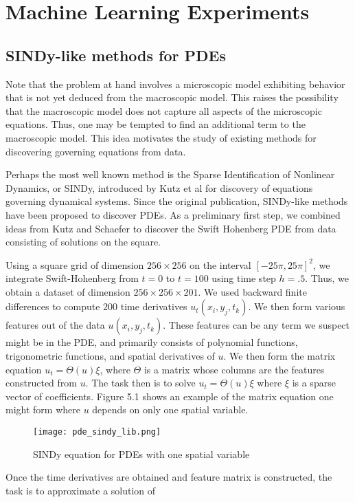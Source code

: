 \documentclass[12pt]{article}
\numberwithin{equation}{section}
\begin{document}
\section{Machine Learning Experiments}
\subsection{SINDy-like methods for PDEs}
\par Note that the problem at hand involves a microscopic model exhibiting behavior that is not yet deduced from the macroscopic model. This raises the possibility that the macroscopic model does not capture all aspects of the microscopic equations. Thus, one may be tempted to find an additional term to the macroscopic model. This idea motivates the study of existing methods for discovering governing equations from data.
\par Perhaps the most well known method is the Sparse Identification of Nonlinear Dynamics, or SINDy, introduced by Kutz et al for discovery of equations governing dynamical systems. Since the original publication, SINDy-like methods have been proposed to discover PDEs. As a preliminary first step, we combined ideas from Kutz and Schaefer to discover the Swift Hohenberg PDE from data consisting of solutions on the square. 
\par Using a square grid of dimension $256 \times 256$ on the interval $[-25\pi,25\pi]^2$, we integrate Swift-Hohenberg from $t=0$ to $t=100$ using time step $h = .5$. Thus, we obtain a dataset of dimension $256 \times 256 \times 201$. We used backward finite differences to compute $200$ time derivatives $u_t(x_i,y_j,t_k)$. We then form various features out of the data $u(x_i,y_j,t_k)$. These features can be any term we suspect might be in the PDE, and primarily consists of polynomial functions, trigonometric functions, and spatial derivatives of $u$. We then form the matrix equation $u_t = \Theta(u)\xi$, where $\Theta$ is a matrix whose columns are the features constructed from $u$. The task then is to solve $u_t = \Theta(u)\xi$ where $\xi$ is a sparse vector of coefficients. Figure 5.1 shows an example of the matrix equation one might form where $u$ depends on only one spatial variable.
\begin{figure}
\centering
\texttt{[image: pde\_sindy\_lib.png]}
\caption{SINDy equation for PDEs with one spatial variable}
\end{figure}
\par Once the time derivatives are obtained and feature matrix is constructed, the task is to approximate a solution of
\end{document}
